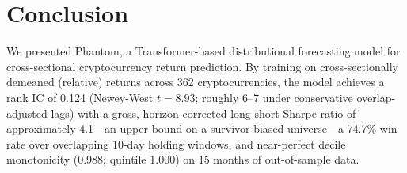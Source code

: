 \documentclass[sigconf]{acmart}
\begin{document}
\begin{table}[t]
\small
\centering
\caption{Ablation across model versions (OOS crypto). ``--'' = not applicable. Sharpe ratios are gross and horizon-corrected (Section~\ref{sec:limitations}); earlier drafts reported these values inflated by ${\sim}\sqrt{10}$ through naive daily annualization of overlapping 10-day returns.}
\label{tab:ablation}
\end{table}


\section{Conclusion}

We presented Phantom, a Transformer-based distributional forecasting model for cross-sectional cryptocurrency return prediction.
By training on cross-sectionally demeaned (relative) returns across 362 cryptocurrencies, the model achieves a rank IC of 0.124 (Newey-West $t = 8.93$; roughly 6--7 under conservative overlap-adjusted lags) with a gross, horizon-corrected long-short Sharpe ratio of approximately 4.1---an upper bound on a survivor-biased universe---a 74.7\% win rate over overlapping 10-day holding windows, and near-perfect decile monotonicity (0.988; quintile 1.000) on 15 months of out-of-sample data.
\end{document}
